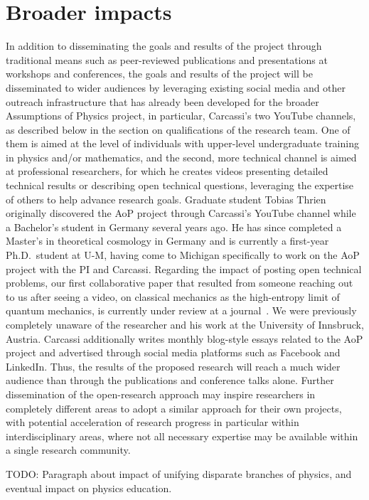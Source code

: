 \section{Broader impacts}
In addition to disseminating the goals and results of the project through traditional means such as peer-reviewed publications and presentations at workshops and conferences, the goals and results of the project will be disseminated to wider audiences by leveraging existing social media and other outreach infrastructure that has already been developed for the broader Assumptions of Physics project, in particular, Carcassi's two YouTube channels, as described below in the section on qualifications of the research team.  One of them is aimed at the level of individuals with upper-level undergraduate training in physics and/or mathematics, and the second, more technical channel is aimed at professional researchers, for which he creates videos presenting detailed technical results or describing open technical questions, leveraging the expertise of others to help advance research goals.  Graduate student Tobias Thrien originally discovered the AoP project through Carcassi's YouTube channel while a Bachelor's student in Germany several years ago.  He has since completed a Master's in theoretical cosmology in Germany and is currently a first-year Ph.D.~student at U-M, having come to Michigan specifically to work on the AoP project with the PI and Carcassi.  Regarding the impact of posting open technical problems, our first collaborative paper that resulted from someone reaching out to us after seeing a video, on classical mechanics as the high-entropy limit of quantum mechanics, is currently under review at a journal~\cite{aop-classicallimit}.  We were previously completely unaware of the researcher and his work at the University of Innsbruck, Austria. Carcassi additionally writes monthly blog-style essays related to the AoP project and advertised through social media platforms such as Facebook and LinkedIn.  Thus, the results of the proposed research will reach a much wider audience than through the publications and conference talks alone.  Further dissemination of the open-research approach may inspire researchers in completely different areas to adopt a similar approach for their own projects, with potential acceleration of research progress in particular within interdisciplinary areas, where not all necessary expertise may be available within a single research community.  

TODO: Paragraph about impact of unifying disparate branches of physics, and eventual impact on physics education.\\

